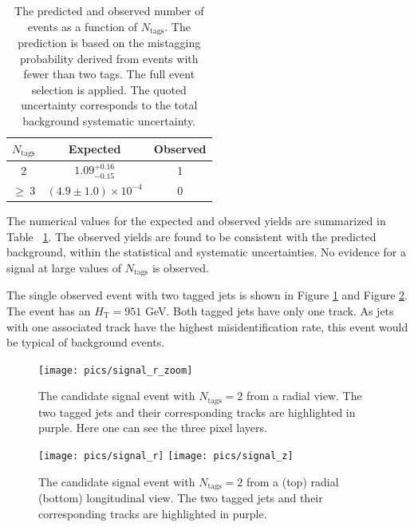 \begin{table}[tb]
  \caption{The predicted and observed number of events as a function
    of $N_{\textrm{tags}}$. The prediction is based on the
    mistagging probability derived from events with fewer than two tags. 
    The full event selection is applied. The quoted uncertainty
    corresponds to the total background systematic uncertainty.\label{tab:result}}
\begin{center}
\begin{tabular}{ccc}
\textbf{$N_{\textrm{tags}}$} & \textbf{Expected} & \textbf{Observed} \\
\hline
2 & $1.09^{+0.16}_{-0.15}$ & 1  \\
$\geq~3$ & $(4.9 \pm 1.0) \times 10^{-4}$ & 0 \\
\end{tabular}
\end{center}
\end{table}

The numerical values for the expected and observed yields are
summarized in Table ~\ref{tab:result}.  The observed yields are found to
be consistent with the predicted background, within the statistical
and systematic uncertainties. No evidence for a signal at large values
of $N_{\textrm{tags}}$ is observed. 

The single observed event with two tagged jets is shown in Figure \ref{fig:candidate_r} and Figure \ref{fig:candidate_rz}. The event has an $H_{\textrm{T}} = 951$ GeV. 
Both tagged jets have only one track. As jets with one associated track have the highest misidentification rate, 
this event would be typical of background events. 

\begin{figure}
\begin{center}
\texttt{[image: pics/signal\_r\_zoom]}
\caption{The candidate signal event with $N_{\textrm{tags}} = 2$ from a radial view. The two tagged jets and their corresponding tracks are highlighted in purple.
Here one can see the three pixel layers. 
\label{fig:candidate_r}}
\end{center}
\end{figure}

\begin{figure}
\begin{center}
\texttt{[image: pics/signal\_r]}
\texttt{[image: pics/signal\_z]}
\caption{The candidate signal event with $N_{\textrm{tags}} = 2$ from a (top) radial (bottom) longitudinal view. 
The two tagged jets and their corresponding tracks are highlighted in purple. \label{fig:candidate_rz}}
\end{center}
\end{figure}


